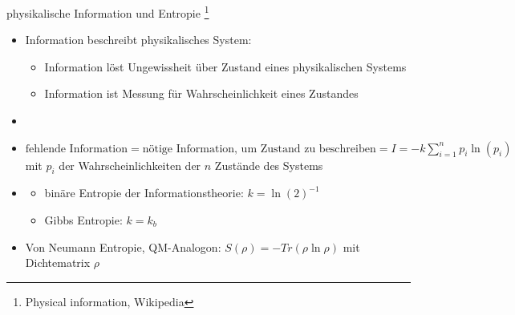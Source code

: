 \documentclass[aspectratio=1610, 9pt]{beamer}
\begin{document}
\begin{frame}{physikalische Information und Entropie \footnote[5]{Physical information, Wikipedia}}
  \begin{itemize}
    \item Information beschreibt physikalisches System:
    \begin{itemize}
      \item[\bullet] Information löst Ungewissheit über Zustand eines physikalischen Systems
      \item[\bullet] Information ist Messung für Wahrscheinlichkeit eines Zustandes
    \end{itemize}
    \item[]
    \item $\text{fehlende Information} = \text{nötige Information, um Zustand zu beschreiben} = I = -k \sum_{i=1}^n{p_i \ln(p_i)}$ \\ mit $p_i$ der Wahrscheinlichkeiten der $n$ Zustände des Systems
    \item[]
    \begin{itemize}
      \item[\rightarrow] binäre Entropie der Informationstheorie: $k = \ln(2)^{-1}$
      \item[\rightarrow] Gibbs Entropie: $k = k_b$
    \end{itemize}
    \item Von Neumann Entropie, QM-Analogon: $S(\rho) = -Tr(\rho \ln\rho)$ mit Dichtematrix $\rho$
  \end{itemize}
\end{frame}
\end{document}
